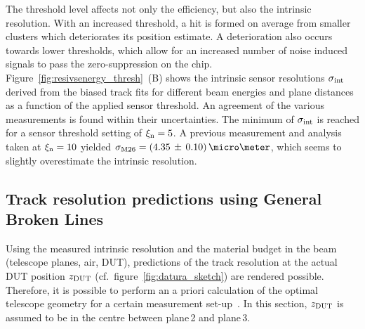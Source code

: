 The threshold level affects not only the efficiency, but also the intrinsic resolution. 
With an increased threshold, a hit is formed on average from smaller clusters which deteriorates its position estimate. 
A deterioration also occurs towards lower thresholds, which allow for an increased number of noise induced signals to pass the zero-suppression on the chip.
Figure~\ref{fig:resivsenergy_thresh}~(B) shows the intrinsic sensor resolutions $\sigma_{\textrm{int}}$ derived from the biased track fits
 for different beam energies and plane distances as a function of the applied sensor threshold.
An agreement of the various measurements is found within their uncertainties. 
The minimum of $\sigma_{\textrm{int}}$ is reached for a sensor threshold setting of $\xi_{\textrm{n}} = 5$.
A previous measurement and analysis~\cite{ref:j.behrmeasurements, ref:joerg} taken at $\xi_{\textrm{n}} = 10$ yielded $\sigma_{\textrm{M26}} = (4.35\,\pm\,0.10)\,\micro\meter$,
 which seems to slightly overestimate the intrinsic resolution. 



\subsection{Track resolution predictions using General Broken Lines}

% 
Using the measured intrinsic resolution and the material budget in the beam (telescope planes, air, DUT),
 predictions of the track resolution at the actual DUT position $z_{\textrm{DUT}}$ (cf.~figure~\ref{fig:datura_sketch}) are rendered possible.
Therefore, it is possible to perform an a priori calculation of the optimal telescope geometry for a certain measurement set-up~\cite{spannagel_2016_48795}. 
In this section, $z_{\textrm{DUT}}$ is assumed to be in the centre between plane\,2 and plane\,3.


